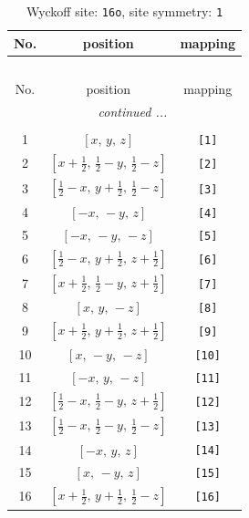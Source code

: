 \documentclass[fleqn,8pt]{jsarticle}
\begin{document}
\begin{longtable}{ccc}
\caption{Wyckoff site: {\tt 16o}, site symmetry: {\tt 1}}
 \\
 \hline \hline
No. & position & mapping \\ \hline \endfirsthead

\multicolumn{2}{l}{\tablename\ \thetable{}} \\
 \hline \hline
No. & position & mapping \\ \hline \endhead

 \hline \hline
\multicolumn{2}{r}{\footnotesize\it continued ...} \\ \endfoot

 \hline \hline
\multicolumn{2}{r}{} \\ \endlastfoot

1 & $\left[ x,\, y,\, z \right]$ & {\tt [1]} \\ \hline
2 & $\left[ x + \frac{1}{2},\, \frac{1}{2} - y,\, \frac{1}{2} - z \right]$ & {\tt [2]} \\ \hline
3 & $\left[ \frac{1}{2} - x,\, y + \frac{1}{2},\, \frac{1}{2} - z \right]$ & {\tt [3]} \\ \hline
4 & $\left[ - x,\, - y,\, z \right]$ & {\tt [4]} \\ \hline
5 & $\left[ - x,\, - y,\, - z \right]$ & {\tt [5]} \\ \hline
6 & $\left[ \frac{1}{2} - x,\, y + \frac{1}{2},\, z + \frac{1}{2} \right]$ & {\tt [6]} \\ \hline
7 & $\left[ x + \frac{1}{2},\, \frac{1}{2} - y,\, z + \frac{1}{2} \right]$ & {\tt [7]} \\ \hline
8 & $\left[ x,\, y,\, - z \right]$ & {\tt [8]} \\ \hline
9 & $\left[ x + \frac{1}{2},\, y + \frac{1}{2},\, z + \frac{1}{2} \right]$ & {\tt [9]} \\ \hline
10 & $\left[ x,\, - y,\, - z \right]$ & {\tt [10]} \\ \hline
11 & $\left[ - x,\, y,\, - z \right]$ & {\tt [11]} \\ \hline
12 & $\left[ \frac{1}{2} - x,\, \frac{1}{2} - y,\, z + \frac{1}{2} \right]$ & {\tt [12]} \\ \hline
13 & $\left[ \frac{1}{2} - x,\, \frac{1}{2} - y,\, \frac{1}{2} - z \right]$ & {\tt [13]} \\ \hline
14 & $\left[ - x,\, y,\, z \right]$ & {\tt [14]} \\ \hline
15 & $\left[ x,\, - y,\, z \right]$ & {\tt [15]} \\ \hline
16 & $\left[ x + \frac{1}{2},\, y + \frac{1}{2},\, \frac{1}{2} - z \right]$ & {\tt [16]} \\
\end{longtable}
\end{document}

